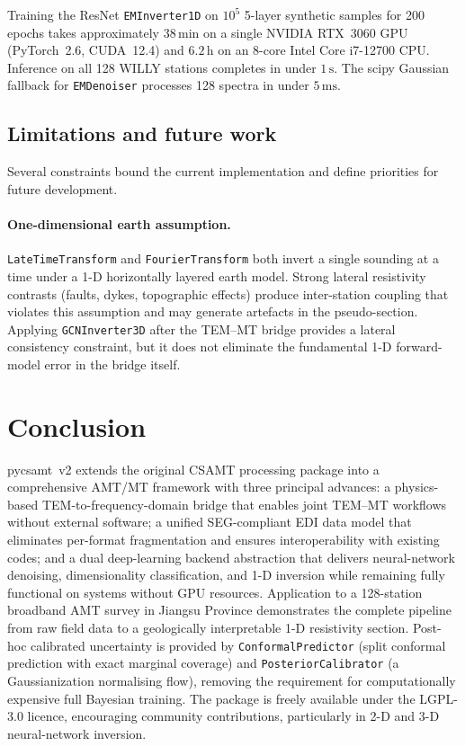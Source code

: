 \documentclass[review,12pt]{elsarticle}
\begin{document}
Training the ResNet \texttt{EMInverter1D} on $10^5$ 5-layer synthetic
samples for 200 epochs takes approximately $38\,\text{min}$ on a single
NVIDIA RTX~3060 GPU (PyTorch~2.6, CUDA~12.4) and $6.2\,\text{h}$ on an
8-core Intel Core i7-12700 CPU.
Inference on all 128 WILLY stations completes in under $1\,\text{s}$.
The scipy Gaussian fallback for \texttt{EMDenoiser} processes
128 spectra in under $5\,\text{ms}$.

\subsection{Limitations and future work}
\label{sec:limitations}

Several constraints bound the current implementation and define
priorities for future development.

\paragraph{One-dimensional earth assumption.}
\texttt{LateTimeTransform} and \texttt{FourierTransform} both invert a
single sounding at a time under a 1-D horizontally layered earth model.
Strong lateral resistivity contrasts (faults, dykes, topographic
effects) produce inter-station coupling that violates this assumption and
may generate artefacts in the pseudo-section.  Applying
\texttt{GCNInverter3D} after the TEM--MT bridge provides a lateral
consistency constraint, but it does not eliminate the fundamental
1-D forward-model error in the bridge itself.

\section{Conclusion}
\label{sec:conclusion}

pycsamt~v2 extends the original CSAMT processing package into a
comprehensive AMT/MT framework with three principal advances:
a physics-based TEM-to-frequency-domain bridge that enables joint TEM–MT
workflows without external software;
a unified SEG-compliant EDI data model that eliminates per-format
fragmentation and ensures interoperability with existing codes;
and a dual deep-learning backend abstraction that delivers neural-network
denoising, dimensionality classification, and 1-D inversion while remaining
fully functional on systems without GPU resources.
Application to a 128-station broadband AMT survey in Jiangsu Province
demonstrates the complete pipeline from raw field data to a geologically
interpretable 1-D resistivity section.
Post-hoc calibrated uncertainty is provided by
\texttt{ConformalPredictor} (split conformal prediction with exact
marginal coverage) and \texttt{PosteriorCalibrator} (a Gaussianization
normalising flow), removing the requirement for computationally expensive
full Bayesian training.
The package is freely available under the LGPL-3.0 licence, encouraging
community contributions, particularly in 2-D and 3-D neural-network
inversion.
\end{document}
